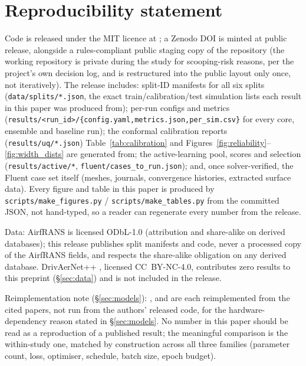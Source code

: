 \documentclass[11pt,a4paper]{article}
\begin{document}
\section*{Reproducibility statement}
Code is released under the MIT licence at ; a Zenodo DOI
is minted at public release, alongside a rules-compliant public staging copy of
the repository (the working repository is private during the study for
scooping-risk reasons, per the project's own decision log, and is restructured
into the public layout only once, not iteratively). The release includes:
split-ID manifests for all six splits (\texttt{data/splits/*.json}, the exact
train/calibration/test simulation lists each result in this paper was produced
from); per-run configs and metrics
(\texttt{results/<run\_id>/\{config.yaml,metrics.json,per\_sim.csv\}} for every
core, ensemble and baseline run); the conformal calibration reports
(\texttt{results/uq/*.json}) Table~\ref{tab:calibration} and
Figures~\ref{fig:reliability}--\ref{fig:width_dists} are generated from; the
active-learning pool, scores and selection
(\texttt{results/active/*}, \texttt{fluent/cases\_to\_run.json}); and, once
solver-verified, the Fluent case set itself (meshes, journals, convergence
histories, extracted surface data). Every figure and table in this paper is
produced by \texttt{scripts/make\_figures.py} / \texttt{scripts/make\_tables.py}
from the committed JSON, not hand-typed, so a reader can regenerate every
number from the release.

Data: AirfRANS \citep{bonnet2022airfrans} is licensed ODbL-1.0
(attribution and share-alike on derived databases); this release publishes
split manifests and code, never a processed copy of the AirfRANS fields, and
respects the share-alike obligation on any derived database. DrivAerNet++
\citep{elrefaie2024drivaernetpp}, licensed CC~BY-NC-4.0, contributes zero
results to this preprint (\S\ref{sec:data}) and is not included in the release.

Reimplementation note (\S\ref{sec:models}): \Mgnn, \Mfno{} and \Mtrans{} are
each reimplemented from the cited papers, not run from the authors' released
code, for the hardware-dependency reason stated in \S\ref{sec:models}. No
number in this paper should be read as a reproduction of a published result;
the meaningful comparison is the within-study one, matched by construction
across all three families (parameter count, loss, optimiser, schedule, batch
size, epoch budget).
\end{document}
